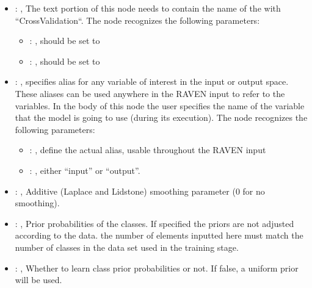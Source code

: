\begin{itemize}
    \item {}: , 
      The text portion of this node needs to contain the name of the  with
               ``CrossValidation``.
      The  node recognizes the following parameters:
        \begin{itemize}
          \item {}: , 
            should be set to 
          \item {}: , 
            should be set to 
      \end{itemize}

    \item {}: , 
      specifies alias for         any variable of interest in the input or output space. These
      aliases can be used anywhere in the RAVEN input to         refer to the variables. In the body
      of this node the user specifies the name of the variable that the model is going to use
      (during its execution).
      The  node recognizes the following parameters:
        \begin{itemize}
          \item {}: , 
            define the actual alias, usable throughout the RAVEN input
          \item {}: , 
            either ``input'' or ``output''.
      \end{itemize}

    \item {}: , 
      Additive (Laplace and Lidstone) smoothing parameter (0 for no smoothing).

    \item {}: , 
      Prior probabilities of the classes. If specified the priors are
      not adjusted according to the data. \nb the number of elements inputted here must
      match the number of classes in the data set used in the training stage.

    \item {}: , 
      Whether to learn class prior probabilities or not. If false, a uniform
      prior will be used.
  \end{itemize}


